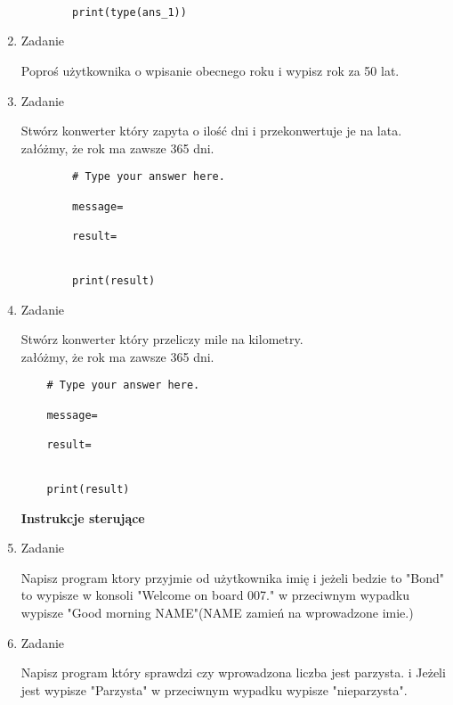 \documentclass[11pt]{article}
\begin{document}
\begin{enumerate}
\begin{lstlisting}
		
		print(type(ans_1))
	\end{lstlisting}
	
	\item 
	\begin{Large}
		Zadanie
	\end{Large}
	\par
	Poproś użytkownika o wpisanie obecnego roku i wypisz rok za 50 lat.
	
	\item 
	\begin{Large}
		Zadanie
	\end{Large}
	\par
	Stwórz konwerter który zapyta o ilość dni i przekonwertuje je na lata.
	\\ załóżmy, że rok ma zawsze 365 dni.
	\begin{lstlisting}
		# Type your answer here.
		
		message=
		
		result=
		
		
		print(result)
	\end{lstlisting}

\item 
\begin{Large}
	Zadanie
\end{Large}
\par
Stwórz konwerter który przeliczy mile na kilometry.
\\ załóżmy, że rok ma zawsze 365 dni.
\begin{lstlisting}
	# Type your answer here.
	
	message=
	
	result=
	
	
	print(result)
\end{lstlisting}

\medskip
\begin{Large}
	\textbf{Instrukcje sterujące}
\end{Large}

\item 
\begin{Large}
	Zadanie
\end{Large}
\par
Napisz program ktory przyjmie od użytkownika imię i jeżeli bedzie to "Bond" to wypisze w konsoli "Welcome on board 007."  w przeciwnym wypadku wypisze "Good morning NAME"(NAME zamień na wprowadzone imie.)

\item 
\begin{Large}
	Zadanie
\end{Large}
\par
Napisz program który sprawdzi czy wprowadzona liczba jest parzysta. i Jeżeli jest wypisze "Parzysta" w przeciwnym wypadku wypisze "nieparzysta".


\end{enumerate}
\end{document}
